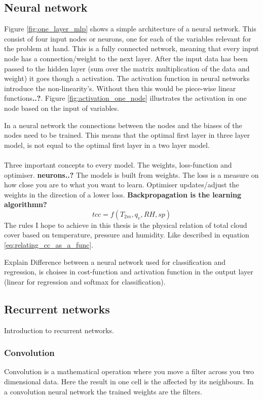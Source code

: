 \subsection{Neural network}

Figure \ref{fig:one_layer_mlp} shows a simple architecture of a neural network. This consist of four input nodes or neurons, one for each of the variables relevant for the problem at hand. This is a fully connected network, meaning that every input node has a connection/weight to the next layer. After the input data has been passed to the hidden layer (sum over the matrix multiplication of the data and weight) it goes though a activation. The activation function in neural networks introduce the non-linearity's. Without then this would be piece-wise linear functions\textbf{..?}. Figure \ref{fig:activation_one_node} illustrates the activation in one node based on the input of variables. 

In a neural network the connections between the nodes and the biases of the nodes need to be trained. This means that the optimal first layer in three layer model, is not equal to the optimal first layer in a two layer model. 
\\ \\
Three important concepts to every model. The weights, loss-function and optimiser. \textbf{neurons..?} The models is built from weights. The loss is a measure on how close you are to what you want to learn. Optimiser updates/adjust the weights in the direction of a lower loss. \textbf{Backpropagation is the learning algorithmn?} 
\begin{equation} \label{eq:relating_cc_as_a_func}
    tcc = f(T_{2m}, q_v, RH, sp)
\end{equation}
The rules I hope to achieve in this thesis is the physical relation of total cloud cover based on temperature, pressure and humidity. Like described in equation  \eqref{eq:relating_cc_as_a_func}.

Explain Difference between a neural network used for classification and regression, is choises in cost-function and activation function in the output layer (linear for regression and softmax for classification). 

\subsection{Recurrent networks}
Introduction to recurrent networks. 

\subsubsection{Convolution}
Convolution is a mathematical operation where you move a filter across you two dimensional data. Here the result in one cell is the affected by its neighbours. In a convolution neural network the trained weights are the filters. 


